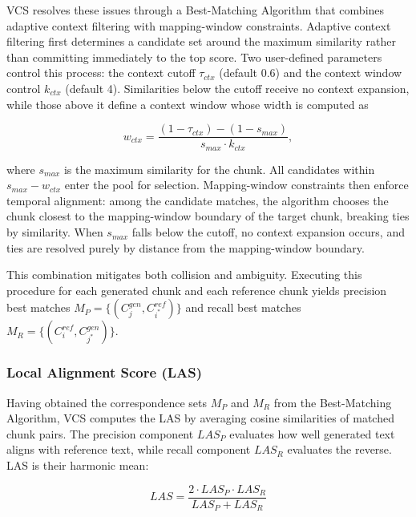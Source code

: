 \documentclass[main.tex]{subfiles}
\begin{document}
VCS resolves these issues through a Best-Matching Algorithm that combines adaptive context filtering with mapping-window constraints. Adaptive context filtering first determines a candidate set around the maximum similarity rather than committing immediately to the top score. Two user-defined parameters control this process: the context cutoff $\tau_{ctx}$ (default 0.6) and the context window control $k_{ctx}$ (default 4). Similarities below the cutoff receive no context expansion, while those above it define a context window whose width is computed as

\begin{equation}
w_{ctx} = \frac{(1-\tau_{ctx})-(1-s_{max})}{s_{max} \cdot k_{ctx}},
\end{equation}

where $s_{max}$ is the maximum similarity for the chunk. All candidates within $s_{max} - w_{ctx}$ enter the pool for selection. Mapping-window constraints then enforce temporal alignment: among the candidate matches, the algorithm chooses the chunk closest to the mapping-window boundary of the target chunk, breaking ties by similarity. When $s_{max}$ falls below the cutoff, no context expansion occurs, and ties are resolved purely by distance from the mapping-window boundary.

This combination mitigates both collision and ambiguity. Executing this procedure for each generated chunk and each reference chunk yields precision best matches $M_P = \{(C_j^{gen}, C_{i^*}^{ref})\}$ and recall best matches $M_R = \{(C_i^{ref}, C_{j^*}^{gen})\}$.

\subsubsection{Local Alignment Score (LAS)}
Having obtained the correspondence sets $M_P$ and $M_R$ from the Best-Matching Algorithm, VCS computes the LAS by averaging cosine similarities of matched chunk pairs. The precision component $LAS_P$ evaluates how well generated text aligns with reference text, while recall component $LAS_R$ evaluates the reverse. LAS is their harmonic mean:

\begin{equation}
LAS = \frac{2 \cdot LAS_P \cdot LAS_R}{LAS_P + LAS_R}
\end{equation}
\end{document}
